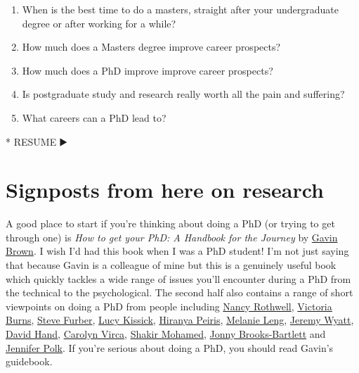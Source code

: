 \documentclass[
]{book}
\newenvironment{Shaded}{\begin{snugshade}}{\end{snugshade}}
\newcommand{\NormalTok}[1]{#1}
\newcommand{\SpecialStringTok}[1]{\textcolor[rgb]{0.31,0.60,0.02}{#1}}
\providecommand{\tightlist}{%
  \setlength{\itemsep}{0pt}\setlength{\parskip}{0pt}}
\begin{document}
\begin{enumerate}
\def\labelenumi{\arabic{enumi}.}
\tightlist
\item
  When is the best time to do a masters, straight after your undergraduate degree or after working for a while?
\item
  How much does a Masters degree improve career prospects?
\item
  How much does a PhD improve improve career prospects?
\item
  Is postgraduate study and research really worth all the pain and suffering?
\item
  What careers can a PhD lead to?
\end{enumerate}

\begin{Shaded}
\begin{Highlighting}[]
\SpecialStringTok{* }\NormalTok{RESUME ▶️}
\end{Highlighting}
\end{Shaded}

\hypertarget{rsignposts}{%
\section{Signposts from here on research}\label{rsignposts}}

A good place to start if you're thinking about doing a PhD (or trying to get through one) is \emph{How to get your PhD: A Handbook for the Journey} by \href{https://twitter.com/profgavinbrown}{Gavin Brown}. \citep{howtogetyourphd} I wish I'd had this book when I was a PhD student! I'm not just saying that because Gavin is a colleague of mine but this is a genuinely useful book which quickly tackles a wide range of issues you'll encounter during a PhD from the technical to the psychological. The second half also contains a range of short viewpoints on doing a PhD from people including \href{https://en.wikipedia.org/wiki/Nancy_Rothwell}{Nancy Rothwell}, \href{https://twitter.com/drvikkiburns}{Victoria Burns}, \href{https://en.wikipedia.org/wiki/Steve_Furber}{Steve Furber}, \href{https://www.lucykissick.co.uk/}{Lucy Kissick}, \href{https://en.wikipedia.org/wiki/Hiranya_Peiris}{Hiranya Peiris}, \href{https://en.wikipedia.org/wiki/Melanie_Leng}{Melanie Leng}, \href{https://www.cs.bham.ac.uk/~jlw/}{Jeremy Wyatt}, \href{https://en.wikipedia.org/wiki/David_Hand_(statistician)}{David Hand}, \href{https://www.linkedin.com/in/carolyn-virca-3446b558/}{Carolyn Virca}, \href{https://shakirm.com/}{Shakir Mohamed}, \href{https://medium.com/@jonnybrooks04}{Jonny Brooks-Bartlett} and \href{https://fromphdtolife.com/}{Jennifer Polk}. If you're serious about doing a PhD, you should read Gavin's guidebook.
\end{document}

